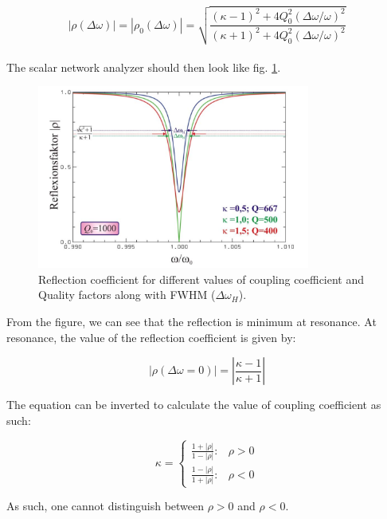 \documentclass[a4paper]{report}
\numberwithin{equation}{section}
\begin{document}
\begin{equation} \label{eqn:scalar}
			\left| \rho (\Delta \omega) \right| = \left| \rho_{0}(\Delta \omega) \right| = \sqrt{\frac{(\kappa - 1)^2 + 4Q_{0}^2 \left(\Delta \omega / \omega \right)^2}{(\kappa + 1)^2 + 4Q_{0}^2 \left(\Delta \omega / \omega \right)^2}} 
\end{equation}
\\
The scalar network analyzer should then look like fig. \ref{fig:scalar}.

\begin{figure}[hbt!]
    \centering
    \includegraphics[width=0.8\textwidth]{scalar}
	\caption{Reflection coefficient for different values of coupling coefficient and Quality factors along with FWHM ($\Delta \omega_{H}$). \cite{Hillert}}
    \label{fig:scalar}
\end{figure}

From the figure, we can see that the reflection is minimum at resonance. At resonance, the value of the reflection coefficient is given by:

\begin{equation}
		\left| \rho (\Delta \omega = 0) \right| = \left| \frac{\kappa - 1}{\kappa +1} \right| 
\end{equation}

The equation can be inverted to calculate the value of coupling coefficient as
such:

\begin{equation}
	\kappa = 
	\begin{cases}
		\frac{1 + |\rho|}{1 - |\rho|} :& \rho > 0\\
		\frac{1 - |\rho|}{1 + |\rho|} :& \rho < 0
	\end{cases}
	\label{eqn:kappa_rho}
\end{equation}

As such, one cannot distinguish between $\rho >0$ and $\rho<0$. 
\end{document}
